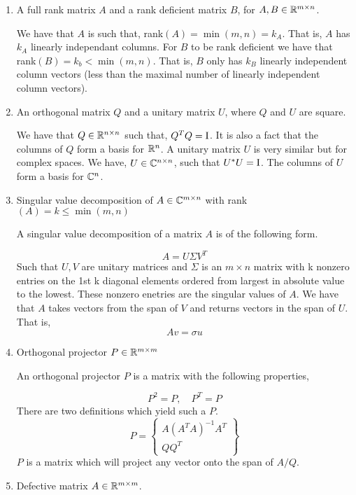 \documentclass{article}
\begin{document}
\begin{enumerate}

\item A full rank matrix $A$ and a rank deficient matrix $B$, for $A, B \in  \mathbb{R}^{m\times n}$. 

We have that $A$ is such that, rank$(A) = \min(m, n) = k_A$. That is, $A$ has $k_A$ linearly independant columns. For $B$ to be rank deficient we have that rank$(B) = k_b < \min(m, n)$. That is, $B$ only has $k_B$ linearly independent column vectors (less than the maximal number of linearly independent column vectors). 

\item An orthogonal matrix $Q$ and a unitary matrix $U$, where $Q$ and $U$ are square. 

We have that $Q \in \mathbb{R}^{n\times n}$ such that, $Q^TQ = \mathrm{I}$. It is also a fact that the columns of $Q$ form a basis for $\mathbb{R}^n$. A unitary matrix $U$ is very similar but for complex spaces. We have, $U \in \mathbb{C}^{n\times n}$, such that $U^*U = \mathrm{I}$. The columns of $U$ form a basis for $\mathbb{C}^n$.

\item Singular value decomposition of $A \in \mathbb{C}^{m\times n}$ with rank$(A) = k \le \min(m, n)$

A singular value decomposition of a matrix $A$ is of the following form. 

\[
    A = U\Sigma V^T
\]
Such that $U, V$ are unitary matrices and $\Sigma$ is an $m\times n$ matrix with k nonzero entries on the 1st k diagonal elements ordered from largest in absolute value to the lowest. These nonzero enetries are the singular values of $A$. We have that $A$ takes vectors from the span of $V$ and returns vectors in the span of $U$. That is, 
\[
    Av = \sigma u
\]

\item Orthogonal projector $P \in \mathbb{R}^{m\times m}$

An orthogonal projector $P$ is a matrix with the following properties, 

\[
    P^2 = P, \quad P^T = P
\]
There are two definitions which yield such a $P$. 
\[
    P = \left\{\begin{array}{c}A(A^TA)^{-1}A^T \\QQ^T\end{array}\right\}
\]
$P$ is a matrix which will project any vector onto the span of $A/Q$.

\item Defective matrix $A \in \mathbb{R}^{m\times m}$.


\end{enumerate}
\end{document}
